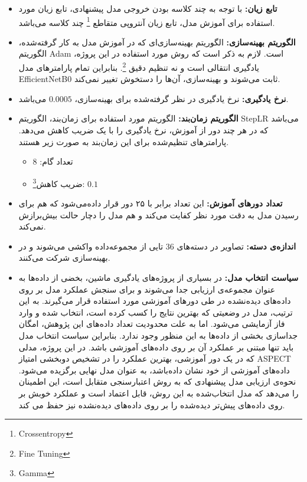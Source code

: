 \begin{itemize}
    \item \textbf{تابع زیان:} با توجه به چند کلاسه بودن خروجی مدل پیشنهادی، تابع زیان مورد استفاده برای آموزش مدل، تابع زیان آنتروپی متقاطع
    \footnote{Crossentropy}
    چند کلاسه می‌باشد.
    \item \textbf{الگوریتم بهینه‌سازی:} الگوریتم بهینه‌سازی‌ای که در آموزش مدل به کار گرفته‌شده، الگوریتم Adam است.
    لازم به ذکر است که روش مورد استفاده در این پروژه، یادگیری انتقالی است و نه تنظیم دقیق \footnote{Fine Tuning}. بنابراین تمام پارامتر‌های مدل EfficientNetB0 ثابت می‌شوند و بهینه‌سازی، آن‌ها را دستخوش تغییر نمی‌کند.
    \item \textbf{نرخ یادگیری:} نرخ یادگیری در نظر گرفته‌شده برای بهینه‌سازی، $0.0005$ می‌باشد.
    \item \textbf{الگوریتم زمان‌بند:} الگوریتم مورد استفاده برای زمان‌بند، الگوریتم StepLR می‌باشد که در هر چند دور از آموزش، نرخ یادگیری را با یک ضریب کاهش می‌دهد. پارامتر‌های تنظیم‌شده برای این زمان‌بند به صورت زیر هستند.
    \begin{itemize}
        \item تعداد گام: 8
        \item ضریب کاهش\footnote{Gamma}: $0.1$
    \end{itemize}
    \item \textbf{تعداد دور‌های آموزش:} این تعداد برابر با ۲۵ دور قرار داده‌می‌شود که هم برای رسیدن مدل به دقت مورد نظر کفایت می‌کند و هم مدل را دچار حالت بیش‌برازش نمی‌کند.
    \item \textbf{اندازه‌ی دسته:} تصاویر در دسته‌های 36 تایی از مجموعه‌داده واکشی می‌شوند و در بهینه‌سازی شرکت می‌کنند.
    \item \textbf{سیاست انتخاب مدل:} در بسیاری از پروژه‌های یادگیری ماشین، بخضی از داده‌ها به عنوان مجموعه‌ی ارزیابی جدا می‌شوند و برای سنجش عملکرد مدل بر روی داده‌های دیده‌نشده در طی دور‌های آموزشی مورد استفاده قرار می‌گیرند.
    به این ترتیب، مدل در وضعیتی که بهترین نتایج را کسب کرده است، انتخاب شده و وارد فاز آزمایشی می‌شود.
    اما به علت محدودیت تعداد داده‌های این پژوهش، امگان جداسازی بخشی از داده‌ها به این منظور وجود ندارد.
    بنابراین سیاست انتخاب مدل باید تنها مبتنی بر عملکرد آن بر روی داده‌های آموزشی باشد.
    در این پروژه، مدلی که در یک دور آموزشی، بهترین عملکرد را در تشخیص دوبخشی امتیاز ASPECT داده‌های آموزشی از خود نشان داده‌باشد، به عنوان مدل نهایی برگزیده می‌شود.
    نحوه‌ی ارزیابی مدل پیشنهادی که به روش اعتبارسنجی متقابل است، این اطمینان را می‌دهد که مدل انتخاب‌شده به این روش، قابل اعتماد است و عملکرد خوبش بر روی داده‌های پیش‌تر دیده‌شده را بر روی داده‌های دیده‌نشده نیز حفظ می کند.
\end{itemize}


